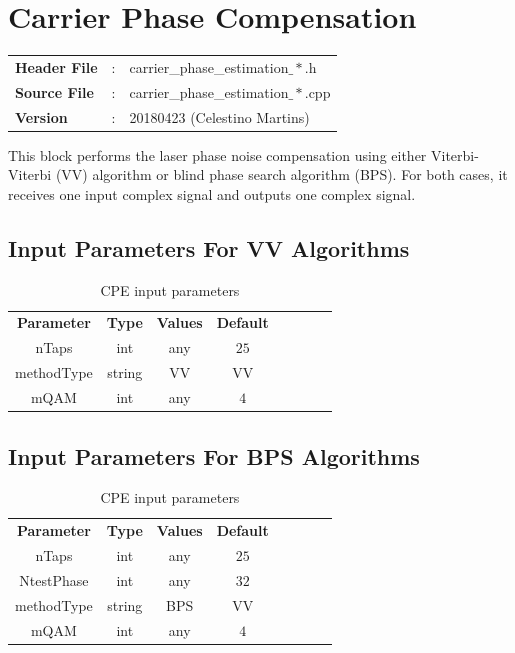 \clearpage

\section{Carrier Phase Compensation}

\begin{tcolorbox}	
	\begin{tabular}{p{2.75cm} p{0.2cm} p{10.5cm}} 	
		\textbf{Header File}   &:& carrier\_phase\_estimation$\_*$.h \\
		\textbf{Source File}   &:& carrier\_phase\_estimation$\_*$.cpp \\
        \textbf{Version}       &:& 20180423 (Celestino Martins) \\
	\end{tabular}
\end{tcolorbox}

This block performs the laser phase noise compensation using either Viterbi-Viterbi (VV) algorithm or blind phase search algorithm (BPS). For both cases, it receives one input complex signal and outputs one complex signal.

\subsection*{Input Parameters For VV Algorithms}

\begin{table}[h]
	\centering
	\begin{tabular}{|c|c|c|c|cccc}
		\cline{1-4}
		\textbf{Parameter} & \textbf{Type} & \textbf{Values} &   \textbf{Default}& \\ \cline{1-4}
		nTaps              & int & any & $25$ \\ \cline{1-4}
        methodType         & string & VV & VV \\ \cline{1-4}
		mQAM                  & int & any & $4$ \\ \cline{1-4}		
	\end{tabular}
	\caption{CPE input parameters}
	\label{table:cpe_in_par_vv}
\end{table}


\subsection*{Input Parameters For BPS Algorithms}

\begin{table}[h]
	\centering
	\begin{tabular}{|c|c|c|c|cccc}
		\cline{1-4}
		\textbf{Parameter} & \textbf{Type} & \textbf{Values} &   \textbf{Default}& \\ \cline{1-4}
		nTaps              & int & any & $25$ \\ \cline{1-4}
        NtestPhase         & int & any & $32$ \\ \cline{1-4}
        methodType         & string & BPS & VV \\ \cline{1-4}
		mQAM                  & int & any & $4$ \\ \cline{1-4}	
	\end{tabular}
	\caption{CPE input parameters}
	\label{table:cpe_in_par_bps}
\end{table}

